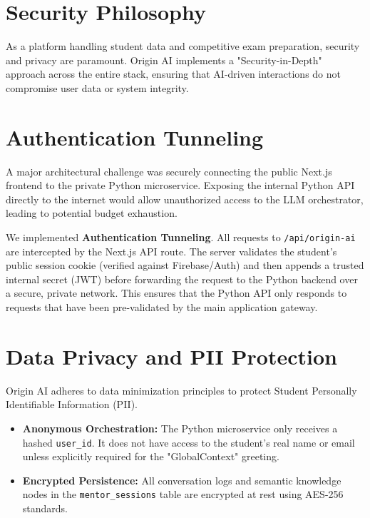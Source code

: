 \section{Security Philosophy}

As a platform handling student data and competitive exam preparation, security and privacy are paramount. Origin AI implements a "Security-in-Depth" approach across the entire stack, ensuring that AI-driven interactions do not compromise user data or system integrity.

\section{Authentication Tunneling}

A major architectural challenge was securely connecting the public Next.js frontend to the private Python microservice. Exposing the internal Python API directly to the internet would allow unauthorized access to the LLM orchestrator, leading to potential budget exhaustion.

We implemented \textbf{Authentication Tunneling}. All requests to \texttt{/api/origin-ai} are intercepted by the Next.js API route. The server validates the student's public session cookie (verified against Firebase/Auth) and then appends a trusted internal secret (JWT) before forwarding the request to the Python backend over a secure, private network. This ensures that the Python API only responds to requests that have been pre-validated by the main application gateway.

\section{Data Privacy and PII Protection}

Origin AI adheres to data minimization principles to protect Student Personally Identifiable Information (PII).

\begin{itemize}
    \item \textbf{Anonymous Orchestration:} The Python microservice only receives a hashed \texttt{user\_id}. It does not have access to the student’s real name or email unless explicitly required for the "GlobalContext" greeting.
    \item \textbf{Encrypted Persistence:} All conversation logs and semantic knowledge nodes in the \texttt{mentor\_sessions} table are encrypted at rest using AES-256 standards.
\end{itemize}

